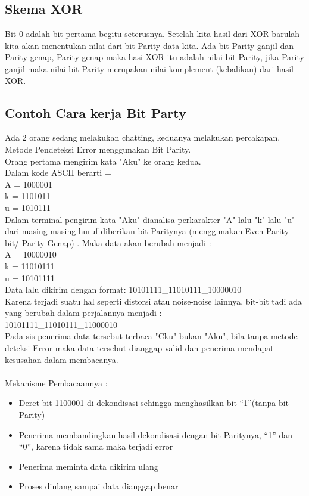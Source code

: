 
\subsection{Skema XOR}
Bit 0 adalah bit pertama begitu seterusnya. Setelah kita hasil dari XOR barulah kita akan menentukan nilai dari bit Parity data kita. Ada bit Parity ganjil dan Parity genap, Parity genap maka hasi XOR itu adalah nilai bit Parity, jika Parity ganjil maka nilai bit Parity merupakan nilai komplement (kebalikan) dari hasil XOR.

\subsection{Contoh Cara kerja Bit Party}
Ada 2 orang sedang melakukan chatting, keduanya melakukan percakapan. Metode Pendeteksi Error menggunakan Bit Parity.\\
Orang pertama mengirim kata "Aku" ke orang kedua.\\
Dalam kode ASCII berarti =\\
A = 1000001\\
k = 1101011\\
u = 1010111\\
Dalam terminal pengirim kata "Aku" dianalisa perkarakter "A" lalu "k" lalu "u"  dari masing masing huruf diberikan bit Paritynya (menggunakan Even Parity bit/ Parity Genap) . Maka data akan berubah menjadi :\\
A = 10000010\\
k = 11010111\\
u = 10101111\\
Data lalu dikirim dengan format: 10101111\_11010111\_10000010\\
Karena terjadi suatu hal seperti distorsi atau noise-noise lainnya, bit-bit tadi ada yang berubah dalam perjalannya menjadi :\\
10101111\_11010111\_11000010\\
Pada sis penerima data tersebut terbaca "Cku" bukan "Aku", bila tanpa metode deteksi Error maka data tersebut dianggap valid dan penerima mendapat kesusahan dalam membacanya.\\ \\
Mekanisme Pembacaannya :
\begin{itemize}
\item Deret bit 1100001 di dekondisasi sehingga menghasilkan bit “1”(tanpa bit Parity)
\item Penerima membandingkan hasil dekondisasi dengan bit Paritynya, “1” dan “0”, karena tidak sama maka terjadi error
\item Penerima meminta data dikirim ulang
\item Proses diulang sampai data dianggap benar
\end{itemize}

